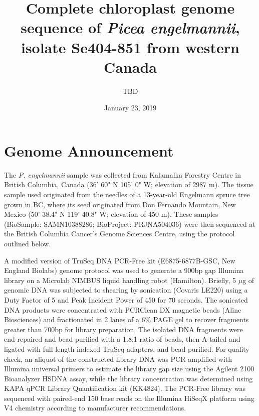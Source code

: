 \documentclass[titlepage,11pt, oneside]{article}   	%
\title{\textbf{Complete chloroplast genome sequence of \textit{Picea engelmannii}, isolate Se404-851 from western Canada\newline}}
\author{TBD}
\date{January 23, 2019}
\begin{document}
\maketitle
\section*{Genome Announcement}

The \textit{P. engelmannii} sample was collected from Kalamalka Forestry Centre in British Columbia, Canada (36' 60" N 105' 0" W; elevation of 2987 m). The tissue sample used originated from the needles of a 13-year-old Engelmann spruce tree grown in BC, where its seed originated from Don Fernando Mountain, New Mexico (50' 38.4" N 119' 40.8" W; elevation of 450 m). These samples (BioSample: SAMN10388286; BioProject: PRJNA504036) were then sequenced at the British Columbia Cancer’s Genome Sciences Centre, using the protocol outlined below.
\newline
\par
A modified version of TruSeq DNA PCR-Free kit (E6875-6877B-GSC, New England Biolabs) genome protocol was used to generate a 900bp gap Illumina library on a Microlab NIMBUS liquid handling robot (Hamilton). Briefly, 5 $\mu$g of genomic DNA was subjected to shearing by sonication (Covaris LE220) using a Duty Factor of 5 and Peak Incident Power of 450 for 70 seconds.  The sonicated DNA products were concentrated with PCRClean DX magnetic beads (Aline Biosciences) and fractionated in 2 lanes of a 6\% PAGE gel to recover fragments greater than 700bp for library preparation.  The isolated DNA fragments were end-repaired and bead-purified with a 1.8:1 ratio of beads, then A-tailed and ligated with full length indexed TruSeq adapters, and bead-purified. For quality check, an aliquot of the constructed library DNA was PCR amplified with Illumina universal primers to estimate the library gap size using the Agilent 2100 Bioanalyzer HSDNA assay, while the library concentration was determined using KAPA qPCR Library Quantification kit (KK4824). The PCR-Free library was sequenced with paired-end 150 base reads on the Illumina HiSeqX platform using V4 chemistry according to manufacturer recommendations.
\newline
\par
\end{document}
